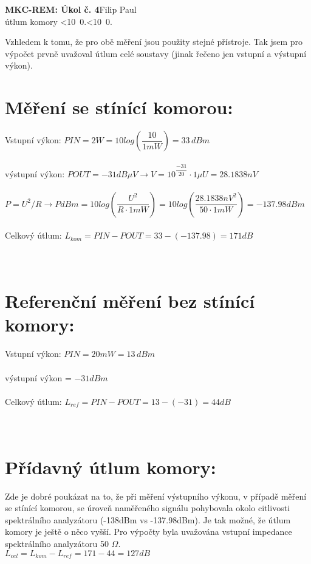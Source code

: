 \documentclass[10pt, a4paper]{article}%
\def\mydate{\leavevmode\hbox{\twodigits\day.\twodigits\month.\the\year}}
\def\twodigits#1{\ifnum#1<10 0\fi\the#1}
\begin{document}
\begin{flushleft}%
	\textbf{\Large{MKC-REM: Úkol č. 4}}\hfill Filip Paul\\
	\large{útlum komory \hfill\mydate}
\end{flushleft}

\noindent Vzhledem k tomu, že pro obě měření jsou použity stejné přístroje.
Tak jsem pro výpočet prvně uvažoval útlum celé soustavy (jinak řečeno jen vstupní
a výstupní výkon).\\

\section{Měření se stínící komorou:}
\noindent Vstupní výkon: $PIN = 2W = 10log(\dfrac{10}{1mW}) = 33\,dBm$\\\\
výstupní výkon: $POUT = -31dB\mu V \rightarrow V = 10^{\dfrac{-31}{20}}\cdot 1 \mu U = 28.1838nV$\\\\
$P = U^2/R \rightarrow PdBm = 10log(\dfrac{U^2}{R\cdot 1mW})= 10log(\dfrac{28.1838nV^2}{50\cdot 1mW}) =  -137.98 dBm  $\\\\
Celkový útlum: $L_{kom} = PIN - POUT = 33 - (-137.98) = 171 dB$\\\\\\


\section{Referenční měření bez stínící komory:}
\noindent Vstupní výkon: $PIN = 20mW = 13\,dBm$\\\\
výstupní výkon = $-31dBm$\\\\
Celkový útlum: $L_{ref} = PIN - POUT = 13 - (-31) = 44 dB$\\\\\\

\section{Přídavný útlum komory:}
Zde je dobré poukázat na to, že při měření výstupního výkonu, v případě měření se stínící komorou, se úroveň naměřeného signálu pohybovala okolo
citlivosti spektrálního analyzátoru (-138dBm vs -137.98dBm). Je tak možné, že útlum komory je ještě o něco vyšší. Pro výpočty byla uvažována
vstupní impedance spektrálního analyzátoru 50 $\Omega$.\\

\noindent $L_{cel} = L_{kom} - L_{ref} = 171 - 44 = 127 dB$\\
\end{document}
